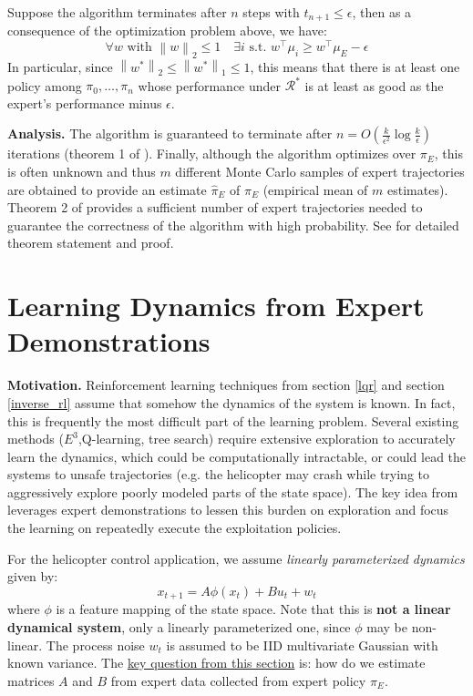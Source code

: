 \documentclass[a4paper]{article}
\newcommand{\norm}[1]{\left\|#1\right\|}
\begin{document}
Suppose the algorithm terminates after $n$ steps with $t_{n+1}\leq\epsilon$, then as a consequence of the optimization problem above, we have:
\begin{equation}
\forall w \text{ with } \norm{w}_2\leq 1 \quad \exists i \text{ s.t. } w^\intercal\mu_i \geq w^\intercal\mu_E - \epsilon
\end{equation}
In particular, since $\norm{w^*}_2 \leq \norm{w^*}_1 \leq 1$, this means that there is at least one policy among $\pi_0,\ldots, \pi_n$ whose performance under $\mathcal{R}^*$ is at least as good as the expert's performance minus $\epsilon$.

\textbf{Analysis.} The algorithm is guaranteed to terminate after $n = O(\frac{k}{\epsilon^2}\log\frac{k}{\epsilon})$ iterations (theorem 1 of \cite{abbeel2004apprenticeship}). Finally, although the algorithm optimizes over $\pi_E$, this is often unknown and thus $m$ different Monte Carlo samples of expert trajectories are obtained to provide an estimate $\hat{\pi}_E$ of $\pi_E$ (empirical mean of $m$ estimates). Theorem 2 of \cite{abbeel2004apprenticeship} provides a sufficient number of expert trajectories needed to guarantee the correctness of the algorithm with high probability. See \cite{abbeel2004apprenticeship} for detailed theorem statement and proof. 
\section{Learning Dynamics from Expert Demonstrations}
\textbf{Motivation.} Reinforcement learning techniques from section \ref{lqr} and section \ref{inverse_rl} assume that somehow the dynamics of the system is known. In fact, this is frequently the most difficult part of the learning problem. Several existing methods ($E^3$,Q-learning, tree search) require extensive exploration to accurately learn the dynamics, which could be computationally intractable, or could lead the systems to unsafe trajectories (e.g. the helicopter may crash while trying to aggressively explore poorly modeled parts of the state space). The key idea from \cite{abbeel2005exploration} leverages expert demonstrations to lessen this burden on exploration and focus the learning on repeatedly execute the exploitation policies. 

For the helicopter control application, we assume \textit{linearly parameterized dynamics} given by:
\begin{equation}
x_{t+1} = A\phi(x_t)+Bu_t+w_t
\end{equation}
where $\phi$ is a feature mapping of the state space. Note that this is \textbf{not a linear dynamical system}, only a linearly parameterized one, since $\phi$ may be non-linear. The process noise $w_t$ is assumed to be IID multivariate Gaussian with known variance. The \underline{key question from this section} is: how do we estimate matrices $A$ and $B$ from expert data collected from expert policy $\pi_E$. 
\end{document}
